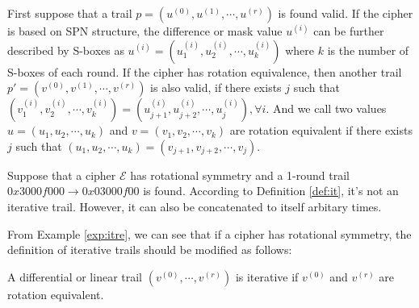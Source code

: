 \begin{definition}
	First suppose that a trail $p=(u^{(0)},u^{(1)},\cdots,u^{(r)})$ is found valid. If the cipher is based on SPN structure, the difference or mask value $u^{(i)}$ can be further described by S-boxes as $u^{(i)}=(u_1^{(i)},u_2^{(i)},\cdots,u_k^{(i)})$ where $k$ is the number of S-boxes of each round. If the cipher has rotation equivalence, then another trail $p'=(v^{(0)},v^{(1)},\cdots,v^{(r)})$ is also valid, if there exists $j$ such that $(v_1^{(i)},v_2^{(i)},\cdots,v_k^{(i)})=(u_{j+1}^{(i)},u_{j+2}^{(i)},\cdots,u_{j}^{(i)}),\forall i$. And we call two values $u=(u_1,u_2,\cdots,u_k)$ and $v=(v_1,v_2,\cdots,v_k)$ are rotation equivalent if there exists $j$ such that $(u_1,u_2,\cdots,u_k)=(v_{j+1},v_{j+2},\cdots,v_{j})$. 
\end{definition}

\begin{example}\label{exp:itre}
	Suppose that a cipher $\mathcal{E}$ has rotational symmetry and a 1-round trail $0x3000f000\rightarrow 0x03000f00$ is found. According to Definition \ref{def:it}, it's not an iterative trail. However, it can also be concatenated to itself arbitary times.
\end{example}

From Example \ref{exp:itre}, we can see that if a cipher has rotational symmetry, the definition of iterative trails should be modified as follows:  

\begin{definition}
	A differential or linear trail $(v^{(0)},\cdots,v^{(r)})$ is iterative if $v^{(0)}$ and $v^{(r)}$ are rotation equivalent.
\end{definition}

